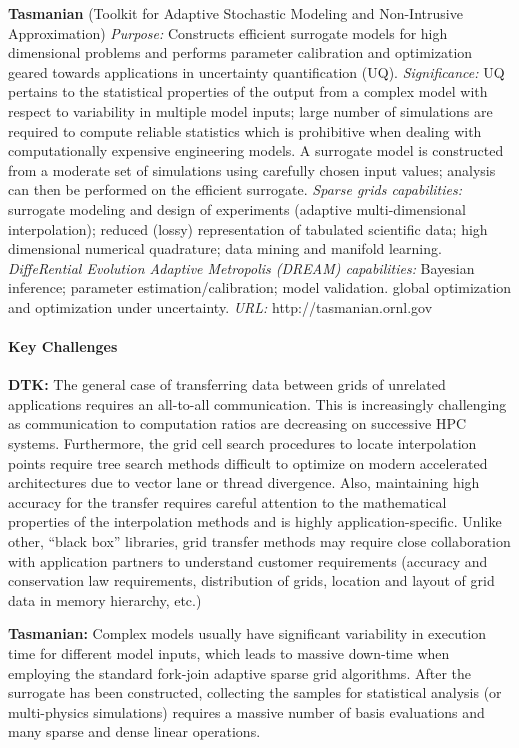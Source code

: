 {\bf Tasmanian} (Toolkit for Adaptive Stochastic Modeling
and Non-Intrusive Approximation)
{\it Purpose:} Constructs efficient surrogate models for high
dimensional problems and performs parameter calibration
and optimization geared towards applications in
uncertainty quantification (UQ).
{\it Significance:}
UQ pertains to the statistical properties of the output from
a complex model with respect to variability in multiple
model inputs; large number of simulations are required to compute
reliable statistics which is prohibitive when dealing with
computationally expensive engineering models. A surrogate model
is constructed from a moderate set of simulations using carefully
chosen input values; analysis can then be performed on the efficient surrogate.
{\it Sparse grids capabilities:}
surrogate modeling and design of experiments (adaptive
multi-dimensional interpolation);
reduced (lossy) representation of tabulated scientific data;
high dimensional numerical quadrature;
data mining and manifold learning.
{\it DiffeRential Evolution Adaptive Metropolis (DREAM)
capabilities:}
Bayesian inference;
parameter estimation/calibration;
model validation.
global optimization and optimization under uncertainty.
{\it URL:}
http://tasmanian.ornl.gov

\paragraph{Key Challenges}

\indent

{\bf DTK:}
The general case of transferring data between grids of
unrelated applications requires an all-to-all
communication.
This is increasingly challenging as communication
to computation ratios are decreasing on successive HPC
systems.
Furthermore, the grid cell search procedures to locate
interpolation points require tree search methods
difficult to optimize on modern accelerated
architectures due to vector lane or thread divergence.
Also, maintaining high accuracy for the transfer requires
careful attention to the mathematical properties of the
interpolation methods and is highly application-specific.
Unlike other, ``black box'' libraries,
grid transfer methods may require close collaboration
with application partners to understand customer
requirements
(accuracy and conservation law requirements,
distribution of grids, location and layout of grid data in
memory hierarchy, etc.)

{\bf Tasmanian:}
Complex models usually have significant variability in execution time
for different model inputs, which leads to massive down-time when
employing the standard fork-join adaptive sparse grid algorithms.
After the surrogate has been constructed, collecting the samples
for statistical analysis (or multi-physics simulations)
requires a massive number of basis evaluations
and many sparse and dense linear operations.

